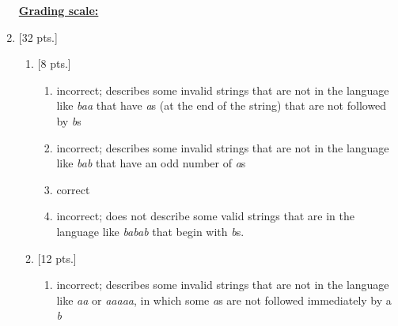\documentclass[11pt,fleqn]{article}
\begin{document}
\begin{enumerate}
\begin{info}{\textbf{\underline{Grading scale:}}}
\begin{itemize}
            \end{itemize}

          \end{info}

    \item {[32 pts.]}

          \vspace{-1.5mm}

          \begin{enumerate}

            \addtolength{\itemsep}{4mm}

            \item {{[8 pts.]}}

                  \begin{enumerate}

                    \addtolength{\itemsep}{2mm}

                    \item incorrect; describes some invalid strings that are
                          not in the language like \emph{baa} that have
                          \emph{a}s (at the end of the string) that are not
                          followed by \emph{b}s

                    \item incorrect; describes some invalid strings that are
                          not in the language like \emph{bab} that have an
                          odd number of \emph{a}s

                    \item correct

                    \item incorrect; does not describe some valid strings
                          that are in the language like \emph{babab} that
                          begin with \emph{b}s.

                  \end{enumerate}

            \item {{[12 pts.]}}

                  \begin{enumerate}

                    \addtolength{\itemsep}{2mm}

                    \item incorrect; describes some invalid strings that are
                          not in the language like \emph{aa} or
                          \emph{aaaaa}, in which some \emph{a}s are not
                          followed immediately by a \emph{b}


\end{enumerate}
\end{enumerate}
\end{enumerate}
\end{document}
